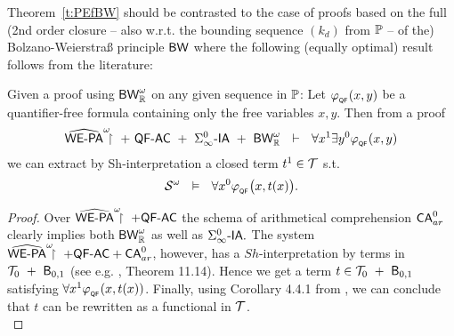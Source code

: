 Theorem~\ref{t:PEfBW} should be contrasted to the case of 
proofs based on the full (2nd order closure -- also w.r.t. the 
bounding sequence $(k_d)$ from $\mathbb{P}$ -- of the) 
Bolzano-Weierstra\ss{} principle 
$\textsf{\upshape BW}$ where the following (equally optimal) result follows from 
the literature: 
\begin{thm} 
\label{t:PEBW}
Given a proof 
using $\textsf{\upshape BW}^\omega_{\mathbb{R}}$ on any given sequence in $\mathbb{P}$: Let $\varphi_{_{\textsf{\upshape QF}}}(x,y)$ be 
a quantifier-free formula containing only the free variables $x,y.$ Then 
from a proof 
\[
\hrrwepa\ +\ \QFm\AC\ +\ \Sigma^0_\infty\usftext{-IA}\ +\ \BW^\omega_\RR\ \ 
\vdash\ \ 
    \forall x^1\exists y^0 \phi_{_\QF}(x,y)
\]
we can extract by Sh-interpretation a closed term $t^1\in\mathcal{T}$ s.t.
\[
\mathcal{S} ^\omega\ \ \vDash\ \ \forall x^0 \varphi_{_{\textsf{\upshape QF}}}\big(x,t(x)\big) \text{.}
\]
\end{thm} 
\begin{proof}
Over $\widehat{\textsf{\upshape WE-PA}}^\omega\!\!\!\restriction\ + \textsf{\upshape QF-}\textsf{\upshape AC}$ the schema of arithmetical comprehension 
$\textsf{\upshape CA}^0_{ar}$ clearly implies both $\textsf{\upshape BW}^\omega_{\mathbb{R}}$ as well as 
$\Sigma^0_{\infty}\textsf{\upshape -IA}.$ The system 
$\widehat{\textsf{\upshape WE-PA}}^\omega\!\!\!\restriction\ + \textsf{\upshape QF-}\textsf{\upshape AC} +\textsf{\upshape CA}^0_{ar}$, however, has a $Sh$-interpretation by terms 
in  $\mathcal{T}_0\ +\ \textsf{\upshape B}_{0,1}$ (see e.g. \cite{Kohlenbach06}, Theorem 11.14).
Hence we get a term $t\in \T_0\ +\ \B_{0,1}$ satisfying
 $\forall x^1\varphi_{_{\textsf{\upshape QF}}}(x,t(x))$. Finally, using Corollary 4.4.1 
from \cite{Kohlenbach99}, 
we can conclude that $t$ can be
rewritten as a functional in $\mathcal{T}$.\\
\end{proof}


